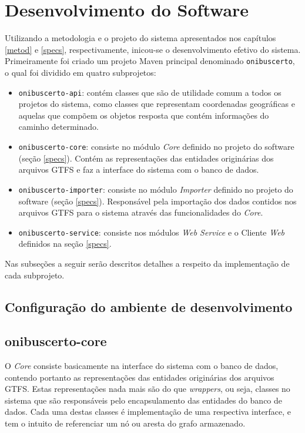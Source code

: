 \chapter{Desenvolvimento do Software}
\label{chap:desenv}

Utilizando a metodologia e o projeto do sistema apresentados nos capítulos \ref{metod} e \ref{specs}, respectivamente, inicou-se o desenvolvimento efetivo do sistema.
Primeiramente foi criado um projeto Maven principal denominado \texttt{onibuscerto}, o qual foi dividido em quatro subprojetos: 
\begin{itemize}
	\item \texttt{onibuscerto-api}: contém classes que são de utilidade comum a todos os projetos do sistema, como classes que representam coordenadas geográficas e aquelas que compõem os objetos resposta que contém informações do caminho determinado.
	\item \texttt{onibuscerto-core}: consiste no módulo \emph{Core} definido no projeto do software (seção \ref{specs}). 
	Contém as representações das entidades originárias dos arquivos GTFS e faz a interface do sistema com o banco de dados.
	\item \texttt{onibuscerto-importer}: consiste no módulo \emph{Importer} definido no projeto do software (seção \ref{specs}).
	Responsável pela importação dos dados contidos nos arquivos GTFS para o sistema através das funcionalidades do \emph{Core}.
	\item \texttt{onibuscerto-service}: consiste nos módulos \emph{Web Service} e o Cliente \emph{Web} definidos na seção \ref{specs}.
\end{itemize}

Nas subseções a seguir serão descritos detalhes a respeito da implementação de cada subprojeto.

\section{Configuração do ambiente de desenvolvimento}

\section{onibuscerto-core}

O \emph{Core} consiste basicamente na interface do sistema com o banco de dados, contendo portanto as representações das entidades originárias dos arquivos GTFS.
Estas representações nada mais são do que \emph{wrappers}, ou seja, classes no sistema que são responsáveis pelo encapsulamento das entidades do banco de dados.
Cada uma destas classes é implementação de uma respectiva interface, e tem o intuito de referenciar um nó ou aresta do grafo armazenado.

